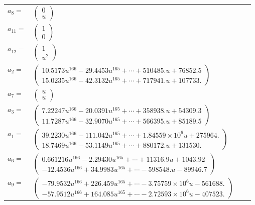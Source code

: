 \documentclass[1p]{elsarticle_modified}
\theoremstyle{definition}
\begin{document}
\begin{tabular}{m{7pt} m{180pt} m{7pt} m{180pt} }
\flushright $a_{8}=$&$\begin{pmatrix}0\\u\end{pmatrix}$ \\
\flushright $a_{11}=$&$\begin{pmatrix}1\\0\end{pmatrix}$ \\
\flushright $a_{12}=$&$\begin{pmatrix}1\\u^2\end{pmatrix}$ \\
\flushright $a_{2}=$&$\begin{pmatrix}10.5173 u^{166}-29.4453 u^{165}+\cdots+510485. u+76852.5\\15.0235 u^{166}-42.3132 u^{165}+\cdots+717941. u+107733.\end{pmatrix}$ \\
\flushright $a_{7}=$&$\begin{pmatrix}u\\u\end{pmatrix}$ \\
\flushright $a_{3}=$&$\begin{pmatrix}7.22247 u^{166}-20.0391 u^{165}+\cdots+358938. u+54309.3\\11.7287 u^{166}-32.9070 u^{165}+\cdots+566395. u+85189.5\end{pmatrix}$ \\
\flushright $a_{1}=$&$\begin{pmatrix}39.2230 u^{166}-111.042 u^{165}+\cdots+1.84559\times10^{6} u+275964.\\18.7469 u^{166}-53.1149 u^{165}+\cdots+880172. u+131530.\end{pmatrix}$ \\
\flushright $a_{6}=$&$\begin{pmatrix}0.661216 u^{166}-2.29430 u^{165}+\cdots+11316.9 u+1043.92\\-12.4536 u^{166}+34.9983 u^{165}+\cdots-598548. u-89946.7\end{pmatrix}$ \\
\flushright $a_{9}=$&$\begin{pmatrix}-79.9532 u^{166}+226.459 u^{165}+\cdots-3.75759\times10^{6} u-561688.\\-57.9512 u^{166}+164.085 u^{165}+\cdots-2.72593\times10^{6} u-407523.\end{pmatrix}$ \\

\end{tabular}
\end{document}

